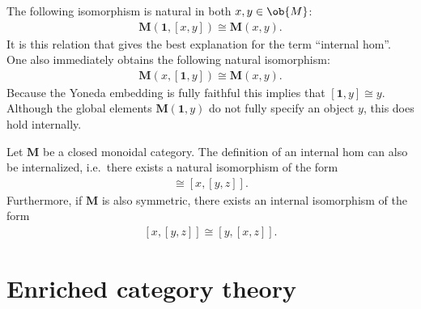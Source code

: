     \begin{property}\label{cat:internal_hom_property}
        The following isomorphism is natural in both $x,y\in\ob{M}$:
        \begin{gather}
            \mathbf{M}(\mathbf{1},[x,y])\cong\mathbf{M}(x,y).
        \end{gather}
        It is this relation that gives the best explanation for the term ``internal hom''. One also immediately obtains the following natural isomorphism:
        \begin{gather}
            \mathbf{M}(x,[\mathbf{1},y])\cong\mathbf{M}(x,y).
        \end{gather}
        Because the Yoneda embedding is fully faithful this implies that $[\mathbf{1},y]\cong y$. Although the global elements $\mathbf{M}(\mathbf{1},y)$ do not fully specify an object $y$, this does hold internally.
    \end{property}

    \begin{property}[Symmetry]
        Let $\mathbf{M}$ be a closed monoidal category. The definition of an internal hom can also be internalized, i.e.~there exists a natural isomorphism of the form
        \begin{gather}
            [x\otimes y,z]\cong[x,[y,z]].
        \end{gather}
        Furthermore, if $\mathbf{M}$ is also symmetric, there exists an internal isomorphism of the form
        \begin{gather}
            \label{cat:internal_symmetry}
            [x,[y,z]]\cong[y,[x,z]].
        \end{gather}
    \end{property}


\section{Enriched category theory}\label{section:enriched_category_theory}


